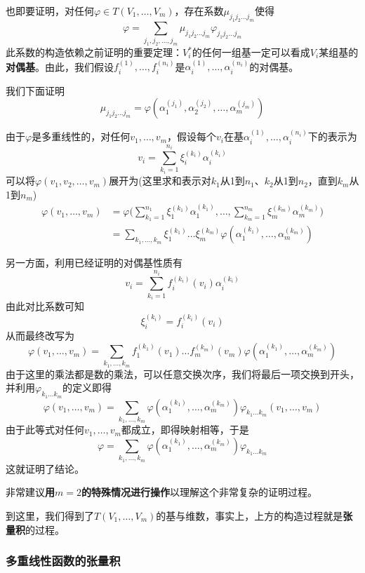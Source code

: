 \documentclass[a4paper,UTF8,fontset=windows,AutoFakeBold]{ctexart}
\newcommand*{\note}{\noindent *}
\begin{document}
{\begin{itemize}
        也即要证明，对任何$\varphi\in T(V_1,\dots,V_m)$，存在系数$\mu_{j_1j_2\dots j_m}$使得
        $$\varphi=\sum_{j_1,j_2,\dots,j_m}\mu_{j_1j_2\dots j_m}\varphi_{j_1j_2\dots j_m}$$
        此系数的构造依赖之前证明的重要定理：$V_i^*$的任何一组基一定可以看成$V_i$某组基的\textbf{对偶基}。由此，我们假设$f_i^{(1)},\dots,f_i^{(n_i)}$是$\alpha_i^{(1)},\dots,\alpha_i^{(n_i)}$的对偶基。

        我们下面证明
        $$\mu_{j_1j_2\dots j_m}=\varphi(\alpha_1^{(j_1)},\alpha_2^{(j_2)},\dots,\alpha_m^{(j_m)})$$

        由于$\varphi$是多重线性的，对任何$v_1,\dots,v_m$，假设每个$v_i$在基$\alpha_i^{(1)},\dots,\alpha_i^{(n_i)}$下的表示为
        $$v_i=\sum_{k_i=1}^{n_i}\xi_i^{(k_i)}\alpha_i^{(k_i)}$$
        可以将$\varphi(v_1,v_2,\dots,v_m)$展开为(这里求和表示对$k_1$从1到$n_1$、$k_2$从1到$n_2$，直到$k_m$从1到$n_m$)
        $$\begin{aligned}\varphi(v_1,\dots,v_m)&=\varphi\bigg(\sum_{k_1=1}^{n_1}\xi_1^{(k_1)}\alpha_1^{(k_1)},\dots,\sum_{k_m=1}^{n_m}\xi_m^{(k_m)}\alpha_m^{(k_m)}\bigg)\\ &=\sum_{k_1,\dots,k_m}\xi_1^{(k_1)}\dots\xi_m^{(k_m)}\varphi(\alpha_1^{(k_1)},\dots,\alpha_m^{(k_m)})\end{aligned}$$

        另一方面，利用已经证明的对偶基性质有
        $$v_i=\sum_{k_i=1}^{n_i}f_i^{(k_i)}(v_i)\alpha_i^{(k_i)}$$
        由此对比系数可知
        $$\xi_i^{(k_i)}=f_i^{(k_i)}(v_i)$$
        从而最终改写为
        $$\varphi(v_1,\dots,v_m)=\sum_{k_1,\dots,k_m}f_1^{(k_1)}(v_1)\dots f_m^{(k_m)}(v_m)\varphi(\alpha_1^{(k_1)},\dots,\alpha_m^{(k_m)})$$
        由于这里的乘法都是数的乘法，可以任意交换次序，我们将最后一项交换到开头，并利用$\varphi_{k_1\dots k_m}$的定义即得
        $$\varphi(v_1,\dots,v_m)=\sum_{k_1,\dots,k_m}\varphi(\alpha_1^{(k_1)},\dots,\alpha_m^{(k_m)})\varphi_{k_1\dots k_m}(v_1,\dots,v_m)$$
        由于此等式对任何$v_1,\dots,v_m$都成立，即得映射相等，于是
        $$\varphi=\sum_{k_1,\dots,k_m}\varphi(\alpha_1^{(k_1)},\dots,\alpha_m^{(k_m)})\varphi_{k_1\dots k_m}$$
        这就证明了结论。

        \note 非常建议\textbf{用$m=2$的特殊情况进行操作}以理解这个非常复杂的证明过程。
    \end{itemize}
}

到这里，我们得到了$T(V_1,\dots,V_m)$的基与维数，事实上，上方的构造过程就是\textbf{张量积}的过程。

\subsubsection{多重线性函数的张量积}
\end{document}
